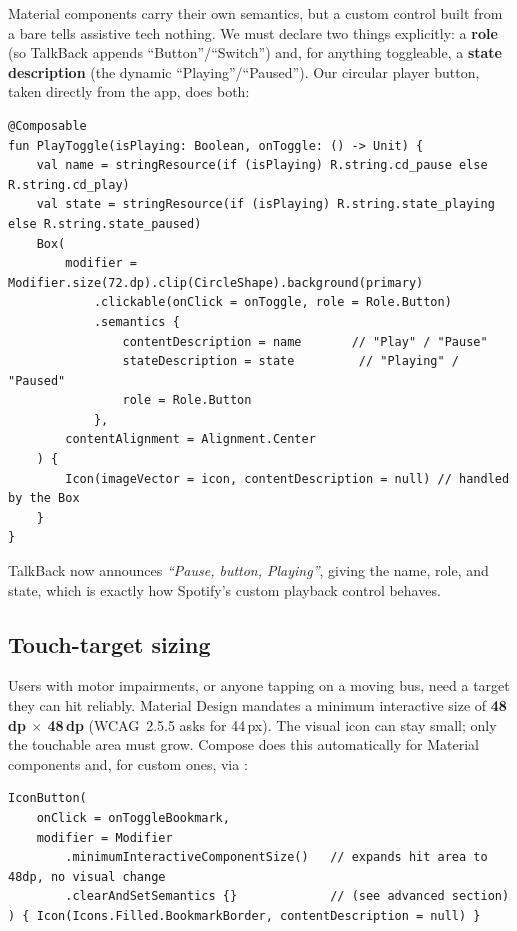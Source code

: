Material components carry their own semantics, but a custom control built from a bare  tells
assistive tech nothing. We must declare two things explicitly: a \textbf{role} (so TalkBack appends
``Button''/``Switch'') and, for anything toggleable, a \textbf{state description} (the dynamic
``Playing''/``Paused''). Our circular player button, taken directly from the app, does both:

\begin{lstlisting}[caption={\texttt{PlayToggle.kt} --- a custom control with an explicit role and a dynamic state.},captionpos=b]
@Composable
fun PlayToggle(isPlaying: Boolean, onToggle: () -> Unit) {
    val name = stringResource(if (isPlaying) R.string.cd_pause else R.string.cd_play)
    val state = stringResource(if (isPlaying) R.string.state_playing else R.string.state_paused)
    Box(
        modifier = Modifier.size(72.dp).clip(CircleShape).background(primary)
            .clickable(onClick = onToggle, role = Role.Button)
            .semantics {
                contentDescription = name       // "Play" / "Pause"
                stateDescription = state         // "Playing" / "Paused"
                role = Role.Button
            },
        contentAlignment = Alignment.Center
    ) {
        Icon(imageVector = icon, contentDescription = null) // handled by the Box
    }
}
\end{lstlisting}

TalkBack now announces \emph{``Pause, button, Playing''}, giving the name, role, and state, which is
exactly how Spotify's custom playback control behaves.

\subsection{Touch-target sizing}

Users with motor impairments, or anyone tapping on a moving bus, need a target they can hit
reliably. Material Design mandates a minimum interactive size of \textbf{48\,dp $\times$ 48\,dp}
(WCAG~2.5.5 asks for 44\,px). The visual icon can stay small; only the touchable area must
grow. Compose does this automatically for Material components and, for custom ones, via
:

\begin{lstlisting}[caption={A 24\,dp icon with a guaranteed 48\,dp touch target.},captionpos=b]
IconButton(
    onClick = onToggleBookmark,
    modifier = Modifier
        .minimumInteractiveComponentSize()   // expands hit area to 48dp, no visual change
        .clearAndSetSemantics {}             // (see advanced section)
) { Icon(Icons.Filled.BookmarkBorder, contentDescription = null) }
\end{lstlisting}

